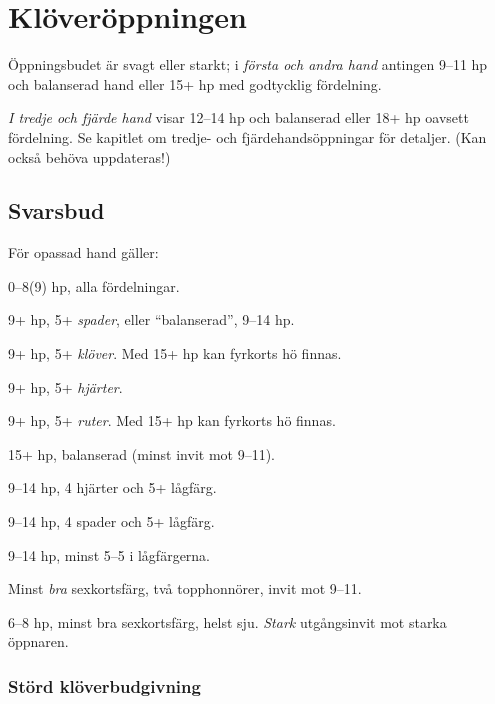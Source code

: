 \chapter{Kl\"over\"oppningen}

\"Oppningsbudet  \"ar svagt eller starkt; i {\em f\"orsta och andra hand}
antingen 9--11 hp och balanserad hand eller 15+ hp med godtycklig f\"ordelning.

{\em I tredje och fj{\"a}rde hand}
 visar  12--14 hp och balanserad eller 18+ hp oavsett fördelning.
Se kapitlet om tredje- och fj\"ardehands\"oppningar f\"or detaljer. (Kan
också behöva uppdateras!)

\section{Svarsbud}

F{\"o}r opassad hand g{\"a}ller:

\bbe
   \item[--\ru{1}] 0--8(9) hp, alla fördelningar.

   \item[--\hj{1}] 9+ hp, 5+ \emph{spader}, eller ``balanserad'', 9--14 hp.

   \item[--\spa{1}] 9+ hp, 5+ \emph{klöver}. Med 15+ hp kan fyrkorts hö finnas.
   \item[--\NT{1}] 9+ hp, 5+ \emph{hjärter}.
   \item[--\kl{2}] 9+ hp, 5+ \emph{ruter}. Med 15+ hp kan fyrkorts hö finnas.
   \item[--\ru{2}] 15+ hp, balanserad (minst invit mot 9--11).
   \item[--\hj{2}] 9--14 hp, 4 hjärter och 5+ lågfärg.
   \item[--\spa{2}] 9--14 hp, 4 spader och 5+ lågfärg.
   \item[--\NT{2}] 9--14 hp, minst 5--5 i lågfärgerna.

   \item[--\la{3}] Minst {\em bra} sexkortsf\"arg, två
     topphonnörer, invit mot 9--11.

   \item[--\ho{3}] 6--8 hp, minst bra sexkortsf\"arg, helst sju. {\em Stark}
                    utg{\aa}ngsinvit mot starka \"oppnaren.

\ebe

\subsection{St{\"o}rd kl{\"o}verbudgivning}


